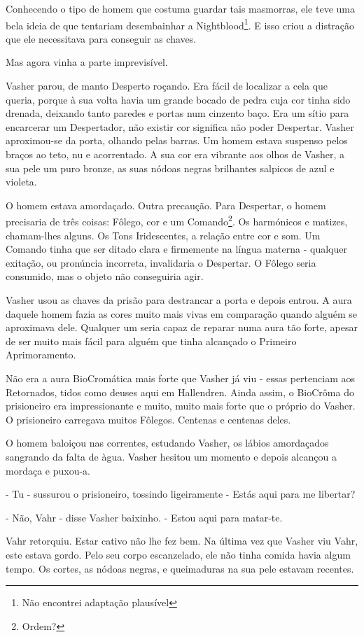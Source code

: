 \documentclass[11pt,a4paper]{book}
\begin{document}
 Conhecendo o tipo de homem que costuma guardar tais masmorras, ele teve uma bela ideia de que tentariam desembainhar a Nightblood\footnote{Não encontrei adaptação plausível}. E isso criou a distração que ele necessitava para conseguir as chaves.

 Mas agora vinha a parte imprevisível.

 Vasher parou, de manto Desperto roçando. Era fácil de localizar a cela que queria, porque à sua volta havia um grande bocado de pedra cuja cor tinha sido drenada, deixando tanto paredes e portas num cinzento baço. Era um sítio para encarcerar um Despertador, não existir cor significa não poder Despertar. Vasher aproximou-se da porta, olhando pelas barras. Um homem estava suspenso pelos braços ao teto, nu e acorrentado. A sua cor era vibrante aos olhos de Vasher, a sua pele um puro bronze, as suas nódoas negras brilhantes salpicos de azul e violeta.

 O homem estava amordaçado. Outra precaução. Para Despertar, o homem precisaria de três coisas: Fôlego, cor e um Comando\footnote{Ordem?}. Os harmónicos e matizes, chamam-lhes alguns. Os Tons Iridescentes, a relação entre cor e som. Um Comando tinha que ser ditado clara e firmemente na língua materna - qualquer exitação, ou pronúncia incorreta, invalidaria o Despertar. O Fôlego seria consumido, mas o objeto não conseguiria agir.
 
 Vasher usou as chaves da prisão para destrancar a porta e depois entrou. A aura daquele homem fazia as cores muito mais vivas em comparação quando alguém se aproximava dele. Qualquer um seria capaz de reparar numa aura tão forte, apesar de ser muito mais fácil para alguém que tinha alcançado o Primeiro Aprimoramento.
 
 Não era a aura BioCromática mais forte que Vasher já viu - essas pertenciam aos Retornados, tidos como deuses aqui em Hallendren. Ainda assim, o BioCrôma do prisioneiro era impressionante e muito, muito mais forte que o próprio do Vasher. O prisioneiro carregava muitos Fôlegos. Centenas e centenas deles.

 O homem baloiçou nas correntes, estudando Vasher, os lábios amordaçados sangrando da falta de àgua. Vasher hesitou um momento e depois alcançou a mordaça e puxou-a.
 
 - Tu - sussurou o prisioneiro, tossindo ligeiramente - Estás aqui para me libertar?
 
 - Não, Vahr - disse Vasher baixinho. - Estou aqui para matar-te.
 
 Vahr retorquiu. Estar cativo não lhe fez bem. Na última vez que Vasher viu Vahr, este estava gordo. Pelo seu corpo escanzelado, ele não tinha comida havia algum tempo. Os cortes, as nódoas negras, e queimaduras na sua pele estavam recentes.
 
\end{document}

